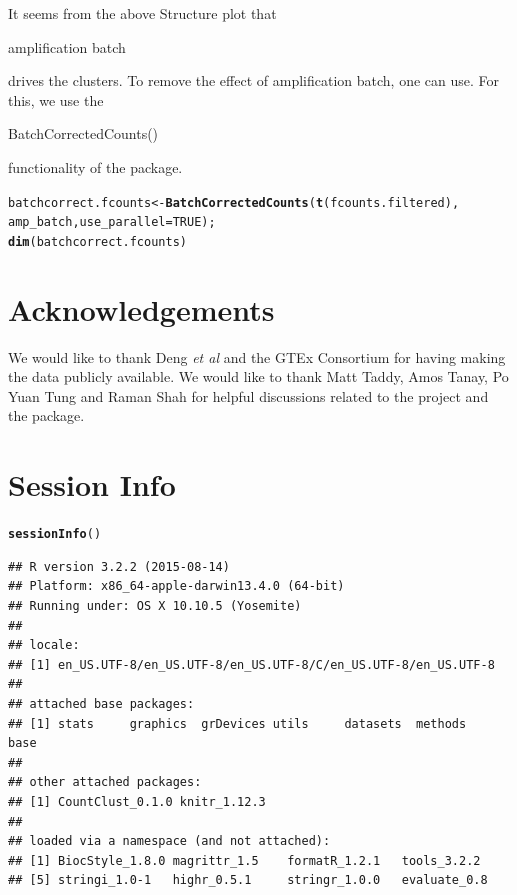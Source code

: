 \documentclass[12pt]{article}\usepackage[]{graphicx}\usepackage[usenames,dvipsnames]{color}
\makeatletter
\newcommand{\hlnum}[1]{\textcolor[rgb]{0.686,0.059,0.569}{#1}}%
\newcommand{\hlstd}[1]{\textcolor[rgb]{0.345,0.345,0.345}{#1}}%
\newcommand{\hlkwb}[1]{\textcolor[rgb]{0.69,0.353,0.396}{#1}}%
\newcommand{\hlkwc}[1]{\textcolor[rgb]{0.333,0.667,0.333}{#1}}%
\newcommand{\hlkwd}[1]{\textcolor[rgb]{0.737,0.353,0.396}{\textbf{#1}}}%
\newenvironment{kframe}{%
 \def\at@end@of@kframe{}%
 \ifinner\ifhmode%
  \def\at@end@of@kframe{\end{minipage}}%
  \begin{minipage}{\columnwidth}%
 \fi\fi%
 \def\FrameCommand##1{\hskip\@totalleftmargin \hskip-\fboxsep
 \colorbox{shadecolor}{##1}\hskip-\fboxsep
     \hskip-\linewidth \hskip-\@totalleftmargin \hskip\columnwidth}%
 \MakeFramed {\advance\hsize-\width
   \@totalleftmargin\z@ \linewidth\hsize
   \@setminipage}}%
 {\par\unskip\endMakeFramed%
 \at@end@of@kframe}
\newenvironment{knitrout}{}{} %
\makeatother
\begin{document}
It seems from the above Structure plot that \begin{verb} amplification batch \end{verb} drives the clusters. To remove the effect of amplification batch, one can use. For this, we use the \begin{verb} BatchCorrectedCounts() \end{verb} functionality of the package.

\clearpage

\begin{knitrout}
\color{fgcolor}\begin{kframe}
\begin{alltt}
\hlstd{batchcorrect.fcounts} \hlkwb{<-} \hlkwd{BatchCorrectedCounts}\hlstd{(}\hlkwd{t}\hlstd{(fcounts.filtered),}
                                             \hlstd{amp_batch,} \hlkwc{use_parallel} \hlstd{=} \hlnum{TRUE}\hlstd{);}
\hlkwd{dim}\hlstd{(batchcorrect.fcounts)}
\end{alltt}
\end{kframe}
\end{knitrout}

\section{Acknowledgements}

We would like to thank Deng \textit{et al} and the GTEx Consortium for having making the data publicly available. We would like to thank Matt Taddy, Amos Tanay, Po Yuan Tung and Raman Shah for helpful discussions related to the project and the package.

\section{Session Info}

\begin{knitrout}
\color{fgcolor}\begin{kframe}
\begin{alltt}
\hlkwd{sessionInfo}\hlstd{()}
\end{alltt}
\begin{verbatim}
## R version 3.2.2 (2015-08-14)
## Platform: x86_64-apple-darwin13.4.0 (64-bit)
## Running under: OS X 10.10.5 (Yosemite)
## 
## locale:
## [1] en_US.UTF-8/en_US.UTF-8/en_US.UTF-8/C/en_US.UTF-8/en_US.UTF-8
## 
## attached base packages:
## [1] stats     graphics  grDevices utils     datasets  methods   base     
## 
## other attached packages:
## [1] CountClust_0.1.0 knitr_1.12.3    
## 
## loaded via a namespace (and not attached):
## [1] BiocStyle_1.8.0 magrittr_1.5    formatR_1.2.1   tools_3.2.2    
## [5] stringi_1.0-1   highr_0.5.1     stringr_1.0.0   evaluate_0.8
\end{verbatim}
\end{kframe}
\end{knitrout}
\end{document}
